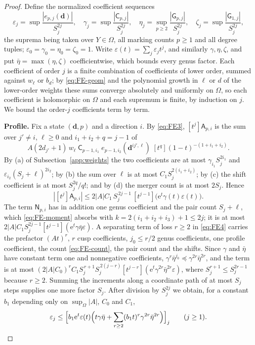 \begin{proof}
Define the normalized coefficient sequences
\[
 \varepsilon_j=\sup\frac{|e_{p,j}(\mathbf d)|}{S_j^{2j}},\quad
 \gamma_j=\sup\frac{|\mathsf C_{p,j}|}{S_j^{2j}},\quad
 \eta_j=\sup_{p\ge2}\frac{|\mathsf G_{p,j}|}{S_j^{2j}},\quad
 \zeta_j=\sup\frac{|\mathsf G_{1,j}|}{S_j^{2j}},
\]
the suprema being taken over $Y\in\Omega$, all marking counts $p\ge1$ and
all degree tuples; $\varepsilon_0=\gamma_0=\eta_0=\zeta_0=1$. Write
$\varepsilon(t)=\sum_j\varepsilon_jt^j$, and similarly $\gamma,\eta,\zeta$,
and put $\bar\eta=\max(\eta,\zeta)$ coefficientwise, which bounds every
genus factor. Each coefficient of order $j$ is a finite combination of
coefficients of lower order, summed against $w_\ell$ or $b_d$; by
\eqref{eq:FE-geom} and the polynomial growth in $\ell$ or $d$ of the
lower-order weights these sums converge absolutely and uniformly on
$\Omega$, so each coefficient is holomorphic on $\Omega$ and each
supremum is finite, by induction on $j$. We bound the order-$j$
coefficients term by term.

\textbf{Profile.} Fix a state $(\mathbf d,p)$ and a direction $i$. By
\eqref{eq:FE3}, $[t^j]\mathsf A_{p,i}$ is the sum over $j'\ne i$,
$\ell\ge0$ and $i_1+i_2+q=j-1$ of
\[
 A(2d_{j'}+1)\,w_\ell\;\mathsf C_{p-1,i_1}\;
 e_{p-1,i_2}(\mathbf d^{ij',\ell})\;[t^q](1-t)^{-(1+i_1+i_2)}.
\]
By (a) of Subsection~\ref{app:weights} the two coefficients are at most
$\gamma_{i_1}S_j^{2i_1}$ and $\varepsilon_{i_2}(S_j+\ell)^{2i_2}$; by
(b) the sum over $\ell$ is at most $C_1S_j^{2(i_1+i_2)}$; by (c) the
shift coefficient is at most $S_j^{2q}/q!$; and by (d) the merger count is
at most $2S_j$. Hence
\[
 |[t^j]\mathsf A_{p,i}|\le2|A|C_1\,S_j^{\,2j-1}\,
 [t^{j-1}]\bigl(\mathrm{e}^{t}\gamma(t)\varepsilon(t)\bigr).
\]
The term $\mathsf N_{p,i}$ has in addition one genus coefficient and the
pair count $S_j+\ell$, which \eqref{eq:FE-moment} absorbs with
$k=2(i_1+i_2+i_3)+1\le2j$; it is at most
$2|A|C_1S_j^{2j-1}[t^{j-1}](\mathrm{e}^{t}\gamma\bar\eta\varepsilon)$.
A separating term of loss $r\ge2$ in \eqref{eq:FE4} carries the
prefactor $(At)^r$, $r$ cusp coefficients, $j_0\le r/2$ genus
coefficients, one profile coefficient, the count \eqref{eq:FE-count}, the
pair count and the shifts. Since $\gamma$ and $\bar\eta$ have constant
term one and nonnegative coefficients,
$\gamma^r\bar\eta^{j_0}\preceq\gamma^{2r}\bar\eta^{2r}$, and the term is
at most
$(2|A|C_0)^rC_1S_j^{\,r+1}S_j^{\,2(j-r)}[t^{j-r}](\mathrm{e}^t\gamma^{2r}\bar\eta^{2r}\varepsilon)$,
where $S_j^{r+1}\le S_j^{2r-1}$ because $r\ge2$. Summing the increments
along a coordinate path of at most $S_j$ steps supplies one more factor
$S_j$. After division by $S_j^{2j}$ we obtain, for a constant $b_1$
depending only on $\sup_\Omega|A|$, $C_0$ and $C_1$,
\begin{equation}
 \varepsilon_j\le\Bigl[b_1\mathrm{e}^{t}\varepsilon(t)
 \Bigl(t\gamma\bar\eta+\sum_{r\ge2}(b_1t)^r\gamma^{2r}\bar\eta^{2r}\Bigr)\Bigr]_j
 \qquad(j\ge1).
 \label{eq:FE-maj-E}
\end{equation}


\end{proof}
